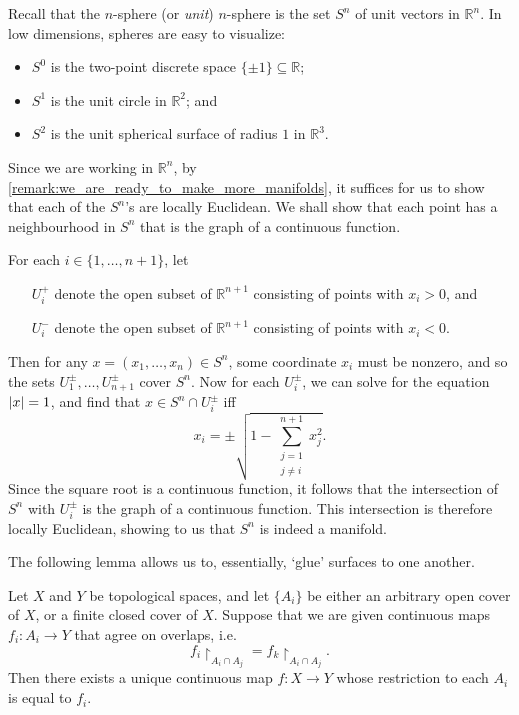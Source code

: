 \documentclass[notoc,notitlepage]{tufte-book}
\begin{document}
\begin{eg}\label{eg:n_spheres_are_manifolds}
  Recall that the $n$-sphere (or \textit{unit}) $n$-sphere is the set $S^n$ of unit vectors in
  $\mathbb{R}^n$. In low dimensions, spheres are easy to visualize:
  \begin{itemize}
    \item $S^0$ is the two-point discrete space $\{ \pm 1 \} \subseteq \mathbb{R}$;
    \item $S^1$ is the unit circle in $\mathbb{R}^2$; and
    \item $S^2$ is the unit spherical surface of radius $1$ in $\mathbb{R}^3$.
  \end{itemize}
  Since we are working in $\mathbb{R}^n$, by \cref{remark:we_are_ready_to_make_more_manifolds},
  it suffices for us to show that each of the $S^n$'s are locally Euclidean. We shall show that
  each point has a neighbourhood in $S^n$ that is the graph of a continuous function.

  For each $i \in \{1, \ldots, n + 1 \}$, let
  \begin{itemize}
    \item[$U_i^+$] denote the open subset of $\mathbb{R}^{n + 1}$ consisting of points with
      $x_i > 0$, and
    \item[$U_i^-$] denote the open subset of $\mathbb{R}^{n + 1}$ consisting of points with
      $x_i < 0$.
  \end{itemize}
  Then for any $x = (x_1, \ldots, x_n) \in S^n$, some coordinate $x_i$ must be nonzero, and so
  the sets $U_1^\pm, \ldots, U_{n + 1}^\pm$ cover $S^n$. Now for each $U_i^\pm$, we can solve
  for the equation $\left| x \right| = 1$, and find that $x \in S^n \cap U_i^\pm$ iff
  \begin{equation*}
    x_i = \pm \sqrt{1 - \sum_{\substack{j=1 \\ j \neq i}}^{n + 1} x_j^2 }.
  \end{equation*}
  Since the square root is a continuous function, it follows that the intersection of $S^n$ with
  $U_i^\pm$ is the graph of a continuous function. This intersection is therefore locally
  Euclidean, showing to us that $S^n$ is indeed a manifold.
\end{eg}

The following lemma allows us to, essentially, `glue' surfaces to one another.

\begin{lemma}\label{lemma:glueing_lemma}
  Let $X$ and $Y$ be topological spaces, and let $\{ A_i \}$ be either an arbitrary open cover
  of $X$, or a finite closed cover of $X$. Suppose that we are given continuous maps $f_i : A_i
  \to Y$ that agree on overlaps, i.e.
  \begin{equation*}
    f_i \restriction_{A_i \cap A_j} = f_k \restriction_{A_i \cap A_j}.
  \end{equation*}
  Then there exists a unique continuous map $f : X \to Y$ whose restriction to each $A_i$ is
  equal to $f_i$.
\end{lemma}
\end{document}
